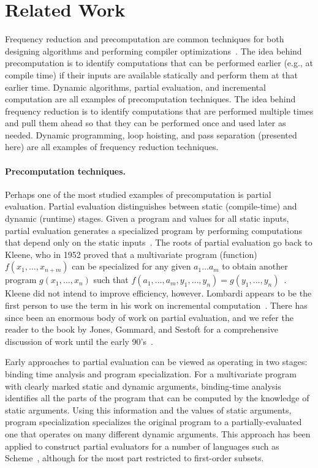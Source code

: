 \section{Related Work}
\label{sec:related}

Frequency reduction and precomputation are common techniques for both
designing algorithms and performing compiler
optimizations~\cite{JS86-staging}.
%
The idea behind precomputation is to identify computations that can be
performed earlier (e.g., at compile time) if their inputs are
available statically and perform them at that earlier time. Dynamic
algorithms, partial evaluation, and incremental computation are all
examples of precomputation techniques.
%
The idea behind frequency
reduction is to identify computations that are performed multiple
times and pull them ahead so that they can be performed once and used
later as needed.  Dynamic programming, loop hoisting, and pass
separation (presented here) are all examples of frequency reduction
techniques.

\paragraph{Precomputation techniques.}
Perhaps one of the most studied examples of precomputation is
partial evaluation.  Partial evaluation distinguishes between static
(compile-time) and dynamic (runtime) stages. Given a program and values 
for all static inputs, partial evaluation generates a specialized program by
performing computations that depend only on the static
inputs~\cite{jones96}.  The roots of partial evaluation go back to
Kleene, who in 1952 proved that a multivariate program (function)
$f(x_1, \ldots, x_{n+m})$ can be specialized for any given $a_1 \ldots
a_m$ to obtain another program $g(x_1, \ldots, x_n)$ such that $f(a_1,
\ldots, a_m, y_1, \ldots, y_n) = g(y_1, \ldots, y_n)$~\cite{Kleene52}.
Kleene did not intend to improve efficiency, however.  Lombardi
appears to be the first person to use the term in his work on
incremental computation~\cite{Lombardi67}.  There has since been 
an enormous body of work on partial evaluation, and we refer the reader to the
book by Jones, Gommard, and Sestoft for a comprehensive discussion of
work until the early 90's~\cite{JGS93}.

Early approaches to partial evaluation can be viewed as operating in
two stages: binding time analysis and program specialization.  For a
multivariate program with clearly marked static and dynamic arguments,
binding-time analysis identifies all the parts of the program that can
be computed by the knowledge of static arguments. Using this
information and the values of static arguments, program
specialization specializes the original program to a partially-evaluated
one that operates on many different dynamic arguments.  This
approach has been applied to construct partial evaluators for a number
of languages such as Scheme~\cite{OB91-Similix,Consel88-Schism}, 
although for the most part restricted to first-order subsets.

